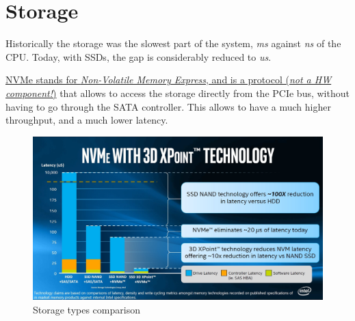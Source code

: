 \section{Storage}


\begin{paracol}{2}
   
   Historically the storage was the slowest part of the system, \textit{ms} against \textit{ns} of the CPU.
   Today, with SSDs, the gap is considerably reduced to \textit{us}.
   
   \ul{NVMe stands for \textit{Non-Volatile Memory Express}, and is a protocol (\textit{not a HW component!})} that allows to access the storage directly from the PCIe bus, without having to go through the SATA controller. This allows to have a much higher throughput, and a much lower latency.

   \switchcolumn

   \begin{figure}[htbp]
      \centering
      \includegraphics{images/storage_intel.jpg}
      \caption{Storage types comparison}
      \label{fig:storage_intel}
   \end{figure}
\end{paracol}

